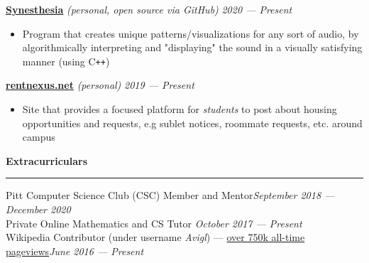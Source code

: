 \documentclass[10pt]{article}
\begin{document}
\begin{flushleft}
\begin{itemize}
		\end{itemize}
		\vspace{-1.5mm}
		\textbf{\href{https://github.com/avigloz/synesthesia}{Synesthesia}} \textit{(personal, open source via GitHub)} \hfill \textit{\small 2020 --- Present}
		\vspace{-2mm}
		\begin{itemize}
			\item Program that creates unique patterns/visualizations for any sort of audio, by algorithmically interpreting and "displaying" the sound in a visually satisfying manner (using C\texttt{++})
		\end{itemize}
		\vspace{-1.5mm}
		\textbf{\href{https://rentnexus.net}{rentnexus.net}} \textit{(personal)} \hfill \textit{\small 2019 --- Present}
		\vspace{-2mm}
		\begin{itemize}
			\item Site that provides a focused platform for \textit{students} to post about housing opportunities and requests, e.g sublet notices, roommate requests, etc. around campus
		\end{itemize}

		\vspace{1.5mm}
		{\large \raggedright \textbf{Extracurriculars}}
		\vspace{1.25mm}
	
		\hrule
	
		\vspace{2.25mm}
		Pitt Computer Science Club (CSC) Member and Mentor\hfill \textit{\small September 2018 --- December 2020}\\
		Private Online Mathematics and CS Tutor \hfill \textit{\small October 2017 --- Present}\\
		Wikipedia Contributor (under username \textit{Avigl}) --- \href{https://pageviews.toolforge.org/?project=en.wikipedia.org&platform=all-access&agent=user&redirects=0&range=all-time&pages=Timeline_of_social_media|Timeline_of_online_advertising|Timeline_of_e-commerce|Screening_Partnership_Program|Silicon_Valley_Education_Foundation|Chicago_Community_Trust}{over 750k all-time pageviews}\hfill \textit{\small June 2016 --- Present}
		
	\end{flushleft}
\end{document}
